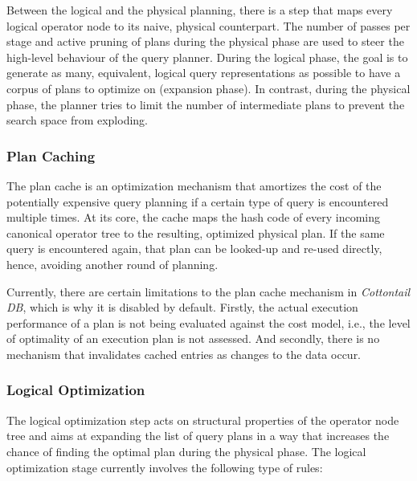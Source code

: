 Between the logical and the physical planning, there is a step that maps every logical operator node to its naive, physical counterpart. The number of passes per stage and active pruning of plans during the physical phase are used to steer the high-level behaviour of the query planner. During the logical phase, the goal is to generate as many, equivalent, logical query representations as possible to have a corpus of plans to optimize on (expansion phase). In contrast, during the physical phase, the planner tries to limit the number of intermediate plans to prevent the search space from exploding.

\subsubsection{Plan Caching}

The plan cache is an optimization mechanism that amortizes the cost of the potentially expensive query planning if a certain type of query is encountered multiple times. At its core, the cache maps the hash code of every incoming canonical operator tree to the resulting, optimized physical plan. If the same query is encountered again, that plan can be looked-up and re-used directly, hence, avoiding another round of planning.

Currently, there are certain limitations to the plan cache mechanism in \emph{Cottontail DB}, which is why it is disabled by default. Firstly, the actual execution performance of a plan is not being evaluated against the cost model, i.e., the level of optimality of an execution plan is not assessed. And secondly, there is no mechanism that invalidates cached entries as changes to the data occur. 

\subsubsection{Logical Optimization}

The logical optimization step acts on structural properties of the operator node tree and aims at expanding the list of query plans in a way that increases the chance of finding the optimal plan during the physical phase. The logical optimization stage currently involves the following type of rules:

